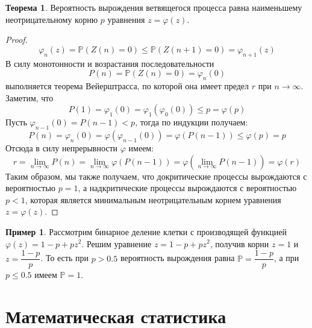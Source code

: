 \documentclass[12pt]{article}
\theoremstyle{definition}
\newtheorem{theorem}{Теорема}[section]
\newtheorem*{example}{Пример}
\newcommand{\prob}{\mathbb{P}}
\begin{document}
\begin{theorem}
    Вероятность вырождения ветвящегося процесса равна наименьшему неотрицательному корню $p$ уравнения $z=\varphi(z)$.
\end{theorem}
\begin{proof}
    $$\varphi_n(z)=\prob(Z(n)=0)\leq \prob(Z(n+1)=0)=\varphi_{n+1}(z)$$
    В силу монотонности и возрастания последовательности
    $$P(n)=\prob(Z(n)=0)=\varphi_n(0)$$
    выполняется теорема Вейерштрасса, по которой она имеет предел $r$ при $n\to\infty$. Заметим, что 
    $$P(1)=\varphi_1(0)=\varphi_1(\varphi_0(0))\leq p=\varphi(p)$$
    Пусть $\varphi_{n-1}(0)=P(n-1)<p$, тогда по индукции получаем:
    $$P(n)=\varphi_n(0)=\varphi(\varphi_{n-1}(0))=\varphi(P(n-1))\leq \varphi(p)=p$$
    Отсюда в силу непрерывности $\varphi$ имеем:
    $$r=\lim_{n\to\infty}P(n)=\lim_{n\to\infty}\varphi(P(n-1))=\varphi\left(\lim_{n\to\infty}P(n-1)\right)=\varphi(r)$$
    Таким образом, мы также получаем, что докритические процессы вырождаются с вероятностью $p=1$, а надкритические процессы вырождаются с вероятностью $p<1$, которая является минимальным неотрицательным корнем уравнения $z=\varphi(z)$.
\end{proof}
\begin{example}
    Рассмотрим бинарное деление клетки с производящей функцией $\varphi(z)=1-p+pz^2$. Решим уравнение $z=1-p+pz^2$, получив корни $z=1$ и $z=\dfrac{1-p}{p}$. То есть при $p>\num{0.5}$ вероятность вырождения равна $\prob=\dfrac{1-p}{p}$, а при $p\leq\num{0.5}$ имеем $\prob=1$.
\end{example}

\section{Математическая статистика}
\end{document}
